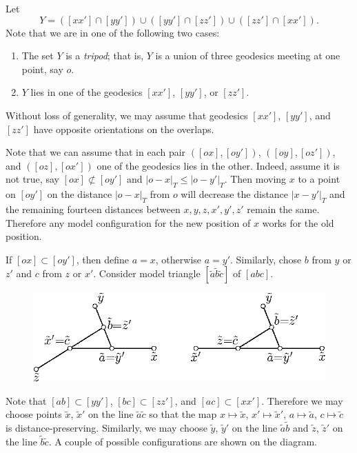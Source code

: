 \documentclass{article}
\begin{document}
Let 
\[Y=([xx']\cap [yy'])\cup([yy']\cap [zz'])\cup([zz']\cap [xx']).\]
Note that we are in one of the following two cases:
\begin{enumerate}
\item The set $Y$ is a \emph{tripod}; that is, $Y$ is a union of three geodesics meeting at one point, say $o$.
\item $Y$ lies in one of the  geodesics $[xx']$, $[yy']$, or $[zz']$.
\end{enumerate}

Without loss of generality, we may assume that geodesics $[xx']$, $[yy']$, and $[zz']$ have opposite orientations on the overlaps.

Note that we can assume that in each pair $([ox],[oy'])$, $([oy],[oz'])$, and $([oz],[ox'])$ one of the geodesics lies in the other.
Indeed, assume it is not true, say $[ox]\not\subset[oy']$ and $|o-x|_T\le |o-y'|_T$.
Then moving $x$ to a point on $[oy']$ on the distance $|o-x|_T$ from $o$ will decrease the distance $|x-y'|_T$ and the remaining fourteen distances between $x,y,z,x',y',z'$ remain the same.
Therefore any model configuration for the new position of $x$ works for the old position.

If $[ox]\subset [oy']$, then define $a=x$, otherwise $a=y'$.
Similarly, chose  $b$ from $y$ or $z'$ and $c$ from $z$ or $x'$.
Consider model triangle $[\tilde a\tilde b\tilde c]$ of $[abc]$.

\begin{figure}[ht!]
\centering
\includegraphics{mppics/pic-50}
\end{figure}

Note that $[ab]\subset [yy']$, $[bc]\subset [zz']$, and $[ac]\subset [xx']$.
Therefore we may choose points $\tilde x$, $\tilde x'$ on the line $\tilde a\tilde c$ so that the map $x\mapsto \tilde x$, $x'\mapsto \tilde x'$, $a\mapsto \tilde a$, $c\mapsto \tilde c$ is distance-preserving.
Similarly, we may choose $\tilde y$, $\tilde y'$ on the line $\tilde a\tilde b$ and $\tilde z$, $\tilde z'$ on the line $\tilde b\tilde c$.
A couple of possible configurations are shown on the diagram.
\end{document}
